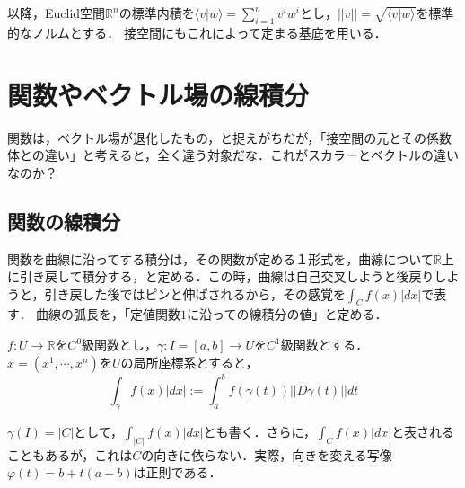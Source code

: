 \documentclass[uplatex, dvipdfmx]{jsreport}
\begin{document}
以降，Euclid空間$\mathbb{R}^n$の標準内積を$\langle v|w\rangle =\sum^n_{i=1}v^iw^i$とし，$||v||=\sqrt{\langle v|w\rangle}$を標準的なノルムとする．
接空間にもこれによって定まる基底を用いる．

\section{関数やベクトル場の線積分}
関数は，ベクトル場が退化したもの，と捉えがちだが，「接空間の元とその係数体との違い」と考えると，全く違う対象だな．これがスカラーとベクトルの違いなのか？

\subsection{関数の線積分}
関数を曲線に沿ってする積分は，その関数が定める１形式を，曲線について$\mathbb{R}$上に引き戻して積分する，と定める．この時，曲線は自己交叉しようと後戻りしようと，引き戻した後ではピンと伸ばされるから，その感覚を$\int_Cf(x)|dx|$で表す．
曲線の弧長を，「定値関数$1$に沿っての線積分の値」と定める．

\begin{shadebox}\begin{definition}
    $f:U\to\mathbb{R}$を$C^0$級関数とし，$\gamma:I=[a,b]\to U$を$C^1$級関数とする．$x=(x^1,\cdots,x^n)$を$U$の局所座標系とすると，
    \[ \int_\gamma f(x)|dx|:=\int^b_af(\gamma(t))||D\gamma(t)||dt \]
    \begin{center}
    \end{center}
\end{definition}\end{shadebox}
\begin{remark}
    $\gamma (I)=|C|$として，$\int_{|C|}f(x)|dx|$とも書く．さらに，$\int_{C}f(x)|dx|$と表されることもあるが，これは$C$の向きに依らない．実際，向きを変える写像$\varphi (t)=b+t(a-b)$は正則である．
\end{remark}
\end{document}
